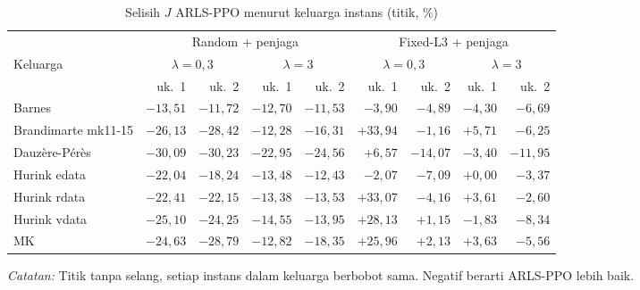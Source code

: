 \begin{table}[htbp]
\caption{Selisih $J$ ARLS-PPO menurut keluarga instans (titik, \%)}
\label{tab:uji-keluarga}
\centering\footnotesize
\setlength{\tabcolsep}{4pt}
\begin{adjustbox}{max width=\textwidth}
\begin{tabular}{lrrrrrrrr}
\toprule
 & \multicolumn{4}{c}{Random + penjaga} & \multicolumn{4}{c}{Fixed-L3 + penjaga} \\
\cmidrule(lr){2-5}\cmidrule(lr){6-9}
Keluarga & \multicolumn{2}{c}{$\lambda=0{,}3$} & \multicolumn{2}{c}{$\lambda=3$} & \multicolumn{2}{c}{$\lambda=0{,}3$} & \multicolumn{2}{c}{$\lambda=3$} \\
 & uk.~1 & uk.~2 & uk.~1 & uk.~2 & uk.~1 & uk.~2 & uk.~1 & uk.~2 \\
\midrule
Barnes & $-13{,}51$ & $-11{,}72$ & $-12{,}70$ & $-11{,}53$ & $-3{,}90$ & $-4{,}89$ & $-4{,}30$ & $-6{,}69$ \\
Brandimarte mk11-15 & $-26{,}13$ & $-28{,}42$ & $-12{,}28$ & $-16{,}31$ & $+33{,}94$ & $-1{,}16$ & $+5{,}71$ & $-6{,}25$ \\
Dauzère-Pérès & $-30{,}09$ & $-30{,}23$ & $-22{,}95$ & $-24{,}56$ & $+6{,}57$ & $-14{,}07$ & $-3{,}40$ & $-11{,}95$ \\
Hurink edata & $-22{,}04$ & $-18{,}24$ & $-13{,}48$ & $-12{,}43$ & $-2{,}07$ & $-7{,}09$ & $+0{,}00$ & $-3{,}37$ \\
Hurink rdata & $-22{,}41$ & $-22{,}15$ & $-13{,}38$ & $-13{,}53$ & $+33{,}07$ & $-4{,}16$ & $+3{,}61$ & $-2{,}60$ \\
Hurink vdata & $-25{,}10$ & $-24{,}25$ & $-14{,}55$ & $-13{,}95$ & $+28{,}13$ & $+1{,}15$ & $-1{,}83$ & $-8{,}34$ \\
MK & $-24{,}63$ & $-28{,}79$ & $-12{,}82$ & $-18{,}35$ & $+25{,}96$ & $+2{,}13$ & $+3{,}63$ & $-5{,}56$ \\
\bottomrule
\end{tabular}
\end{adjustbox}
\par\smallskip\footnotesize\textit{Catatan:} Titik tanpa selang, setiap instans dalam keluarga berbobot sama. Negatif berarti ARLS-PPO lebih baik.
\end{table}

